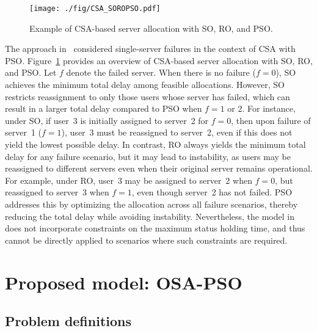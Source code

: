 \documentclass[conference]{IEEEtran}
\begin{document}
\begin{CJK}{UTF8}{ipxm}
\begin{figure}[tb]
  \begin{center}
      \texttt{[image: ./fig/CSA\_SOROPSO.pdf]}
  \end{center}
    \vspace{-0.4cm}
  \caption{Example of CSA-based server allocation with SO, RO, and PSO.}
  \label{fig:CSA_SOROPSO}
\end{figure}
The approach in~\cite{5_9_Masuda2020} considered single-server failures in the context of CSA with PSO.
Figure~\ref{fig:CSA_SOROPSO} provides an overview of CSA-based server allocation with SO, RO, and PSO.
Let $f$ denote the failed server.
When there is no failure ($f = 0$), SO achieves the minimum total delay among feasible allocations.
However, SO restricts reassignment to only those users whose server has failed, which can result in a larger total delay compared to PSO when $f = 1$ or $2$.
For instance, under SO, if user~3 is initially assigned to server~2 for $f = 0$, then upon failure of server~1 ($f = 1$), user~3 must be reassigned to server~2, even if this does not yield the lowest possible delay.
In contrast, RO always yields the minimum total delay for any failure scenario, but it may lead to instability, as users may be reassigned to different servers even when their original server remains operational.
For example, under RO, user~3 may be assigned to server~2 when $f = 0$, but reassigned to server~3 when $f = 1$, even though server~2 has not failed.
PSO addresses this by optimizing the allocation across all failure scenarios, thereby reducing the total delay while avoiding instability.
Nevertheless, the model in~\cite{5_9_Masuda2020} does not incorporate constraints on the maximum status holding time, and thus cannot be directly applied to scenarios where such constraints are required.

\section{Proposed model: OSA-PSO}
\label{sec:proposed_mode_osa_pso}

\subsection{Problem definitions}


\end{CJK}
\end{document}

